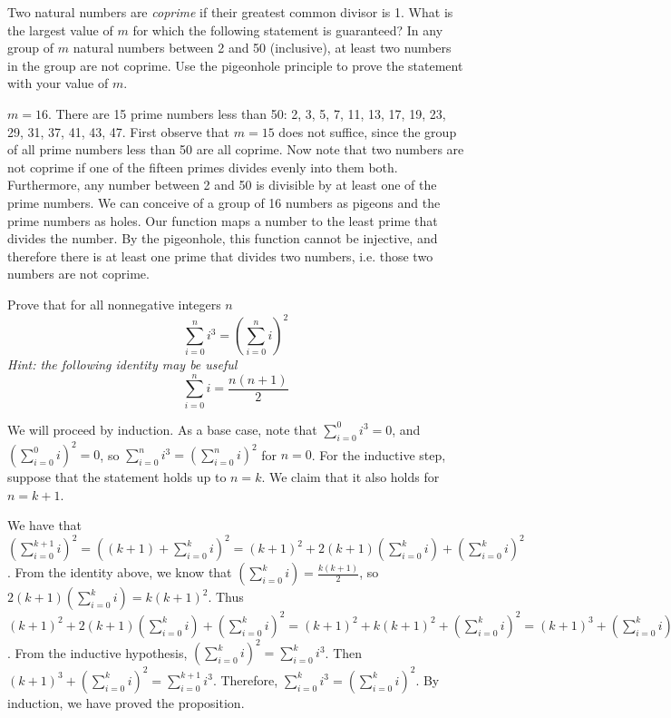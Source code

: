 \documentclass[solution, letterpaper]{cs20}
\begin{document}
Two natural numbers are \textit{coprime} if their greatest common divisor is 1. What is the largest value of $m$ for which the following statement is guaranteed? In any group of $m$ natural numbers between 2 and 50 (inclusive), at least two numbers in the group are not coprime. Use the pigeonhole principle to prove the statement with your value of $m$. 

\begin{solution}

$m = 16$. There are 15 prime numbers less than 50: 2, 3, 5, 7, 11, 13, 17, 19, 23, 29, 31, 37, 41, 43, 47. First observe that $m = 15$ does not suffice, since the group of all prime numbers less than 50 are all coprime. Now note that two numbers are not coprime if one of the fifteen primes divides evenly into them both. Furthermore, any number between 2 and 50 is divisible by at least one of the prime numbers. We can conceive of a group of 16 numbers as pigeons and the prime numbers as holes. Our function maps a number to the least prime that divides the number. By the pigeonhole, this function cannot be injective, and therefore there is at least one prime that divides two numbers, i.e. those two numbers are not coprime.

\end{solution}


Prove that for all nonnegative integers $n$
\[ \sum_{i=0}^{n}i^{3}=\left( \sum_{i=0}^{n}i \right)^{2} \]
{\em Hint: the following identity may be useful}
\[ \sum_{i=0}^ni=\frac{n(n+1)}{2} \]

\begin{solution}
  
We will proceed by induction. As a base case, note that $\sum_{i=0}^0 i^3 = 0$, and 
$\left( \sum_{i=0}^{0}i \right)^{2} = 0$, so $\sum_{i=0}^{n}i^{3}=\left( \sum_{i=0}^{n}i \right)^{2}$ for $n = 0$. For the inductive step, suppose that the statement holds up to $n = k$. We claim that it also holds for $n = k+1$.

We have that $\left( \sum_{i=0}^{k+1}i \right)^{2} = \left((k+1)+ \sum_{i=0}^{k}i \right)^{2} = (k+1)^2 + 2(k+1)(\sum_{i=0}^{k}i) + (\sum_{i=0}^{k}i)^2$. From the identity above, we know that $(\sum_{i=0}^{k}i) = \frac{k(k+1)}{2}$, so $2(k+1)(\sum_{i=0}^{k}i) = k(k+1)^2$. Thus $(k+1)^2 + 2(k+1)(\sum_{i=0}^{k}i) + (\sum_{i=0}^{k}i)^2 = (k+1)^2 + k(k+1)^2 + (\sum_{i=0}^{k}i)^2 = (k+1)^3 + (\sum_{i=0}^{k}i)^2$. From the inductive hypothesis, $(\sum_{i=0}^{k}i)^2 = \sum_{i=0}^{k}i^{3}$. Then $(k+1)^3 + (\sum_{i=0}^{k}i)^2 = \sum_{i=0}^{k+1}i^{3}$. Therefore, $\sum_{i=0}^{k}i^{3}=\left( \sum_{i=0}^{k}i \right)^{2}$. By induction, we have proved the proposition.  
  
\end{solution}
\end{document}
